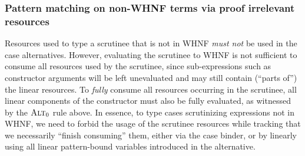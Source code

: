 \documentclass[acmsmall,review,anonymous,screen]{acmart}
\begin{document}

\subsubsection{Pattern matching on non-WHNF terms via proof irrelevant resources}

Resources used to type a scrutinee that is not in WHNF \emph{must not} be used in
the case alternatives.
%
However, evaluating the scrutinee to WHNF is not sufficient to
consume all resources used by the scrutinee, since sub-expressions such
as constructor arguments will be left unevaluated and may still contain
(``parts of'') the linear resources. To \emph{fully} consume all
resources occurring in the scrutinee, all linear components of the
constructor must also be fully evaluated, as witnessed by the
$\textsc{Alt}_0$ rule above.
%
In essence, to type cases scrutinizing expressions not in WHNF, we need to
forbid the usage of the scrutinee resources while tracking that we necessarily
``finish consuming'' them, either via the case binder, or by linearly using all
linear pattern-bound variables introduced in the alternative.




\end{document}
